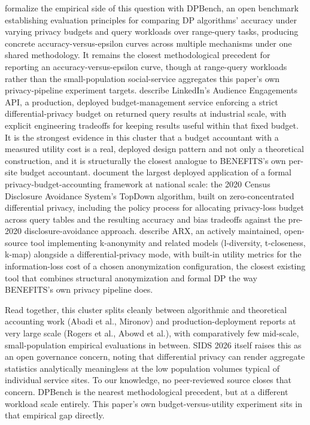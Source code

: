 \cite{hay2016} formalize the empirical side of this question with DPBench, an open benchmark establishing evaluation principles for comparing DP algorithms' accuracy under varying privacy budgets and query workloads over range-query tasks, producing concrete accuracy-versus-epsilon curves across multiple mechanisms under one shared methodology. It remains the closest methodological precedent for reporting an accuracy-versus-epsilon curve, though at range-query workloads rather than the small-population social-service aggregates this paper's own privacy-pipeline experiment targets. \cite{rogers2021} describe LinkedIn's Audience Engagements API, a production, deployed budget-management service enforcing a strict differential-privacy budget on returned query results at industrial scale, with explicit engineering tradeoffs for keeping results useful within that fixed budget. It is the strongest evidence in this cluster that a budget accountant with a measured utility cost is a real, deployed design pattern and not only a theoretical construction, and it is structurally the closest analogue to BENEFITS's own per-site budget accountant. \cite{abowd2022} document the largest deployed application of a formal privacy-budget-accounting framework at national scale: the 2020 Census Disclosure Avoidance System's TopDown algorithm, built on zero-concentrated differential privacy, including the policy process for allocating privacy-loss budget across query tables and the resulting accuracy and bias tradeoffs against the pre-2020 disclosure-avoidance approach. \cite{prasser2020} describe ARX, an actively maintained, open-source tool implementing k-anonymity and related models (l-diversity, t-closeness, k-map) alongside a differential-privacy mode, with built-in utility metrics for the information-loss cost of a chosen anonymization configuration, the closest existing tool that combines structural anonymization and formal DP the way BENEFITS's own privacy pipeline does.

Read together, this cluster splits cleanly between algorithmic and theoretical accounting work (Abadi et al., Mironov) and production-deployment reports at very large scale (Rogers et al., Abowd et al.), with comparatively few mid-scale, small-population empirical evaluations in between. SIDS 2026 \cite{katrakazas2026} itself raises this as an open governance concern, noting that differential privacy can render aggregate statistics analytically meaningless at the low population volumes typical of individual service sites. To our knowledge, no peer-reviewed source closes that concern. DPBench is the nearest methodological precedent, but at a different workload scale entirely. This paper's own budget-versus-utility experiment sits in that empirical gap directly.

